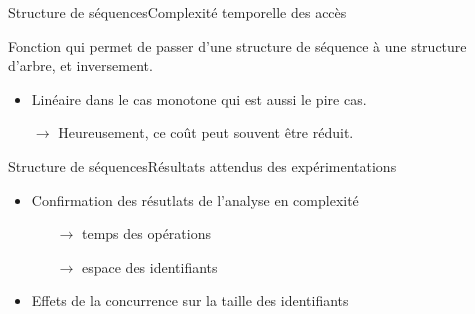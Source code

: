 \begin{frame}{Structure de séquences}{Complexité temporelle des accès}
  
  \begin{center}
    
  \end{center}
  
  Fonction qui permet de passer d'une structure de séquence à une structure
  d'arbre, et inversement.
  
  \vspace{0.25cm}%
  \begin{center}%
  
  \end{center}%
  \vspace{0.25cm}

  \begin{itemize}
  \item Linéaire dans le cas monotone qui est aussi le pire cas.
  \item [$\rightarrow$] Heureusement, ce coût peut souvent être réduit.
  \end{itemize}
  
\end{frame}


  

\begin{frame}{Structure de séquences}{Résultats attendus des expérimentations}
  
  \begin{itemize}
  \item Confirmation des résutlats de l'analyse en complexité
    \begin{itemize}
    \item [$\rightarrow$] temps des opérations
    \item [$\rightarrow$] espace des identifiants
    \end{itemize}
  \item Effets de la concurrence sur la taille des identifiants
  \end{itemize}

\end{frame}



